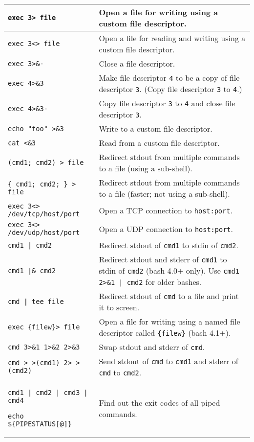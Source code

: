 \documentclass{article}
\begin{document}
\begin{tabular}{|m{5.5cm}|m{12.2cm}|}
\hline
\verb|exec 3> file| & Open a file for writing using a custom file descriptor. \\
\hline
\verb|exec 3<> file| & Open a file for reading and writing using a custom file descriptor. \\
\hline
\verb|exec 3>&-| & Close a file descriptor. \\
\hline
\verb|exec 4>&3| & Make file descriptor \verb|4| to be a copy of file descriptor \verb|3|. (Copy file descriptor \verb|3| to \verb|4|.) \\
\hline
\verb|exec 4>&3-| & Copy file descriptor \verb|3| to \verb|4| and close file descriptor \verb|3|. \\
\hline
\verb|echo "foo" >&3| & Write to a custom file descriptor. \\
\hline
\verb|cat <&3| & Read from a custom file descriptor. \\
\hline
\verb|(cmd1; cmd2) > file| & Redirect stdout from multiple commands to a file (using a sub-shell). \\
\hline
\verb|{ cmd1; cmd2; } > file| & Redirect stdout from multiple commands to a file (faster; not using a sub-shell). \\
\hline
\verb|exec 3<> /dev/tcp/host/port| & Open a TCP connection to \verb|host:port|. \\
\hline
\verb|exec 3<> /dev/udp/host/port| & Open a UDP connection to \verb|host:port|. \\
\hline
\verb/cmd1 | cmd2/ & Redirect stdout of \verb|cmd1| to stdin of \verb|cmd2|. \\
\hline
\verb/cmd1 |& cmd2/ & Redirect stdout and stderr of \verb|cmd1| to stdin of \verb|cmd2| (bash 4.0+ only). Use \verb/cmd1 2>&1 | cmd2/ for older bashes. \\
\hline
\verb/cmd | tee file/ & Redirect stdout of \verb|cmd| to a file and print it to screen. \\
\hline
\verb|exec {filew}> file| & Open a file for writing using a named file descriptor called \verb|{filew}| (bash 4.1+). \\
\hline
\verb|cmd 3>&1 1>&2 2>&3| & Swap stdout and stderr of \verb|cmd|. \\
\hline
\verb|cmd > >(cmd1) 2> >(cmd2)| & Send stdout of \verb|cmd| to \verb|cmd1| and stderr of \verb|cmd| to \verb|cmd2|. \\
\hline
\verb/cmd1 | cmd2 | cmd3 | cmd4/ \par
\verb/echo ${PIPESTATUS[@]}/ & Find out the exit codes of all piped commands. \\
\hline
\end{tabular}
\end{document}
